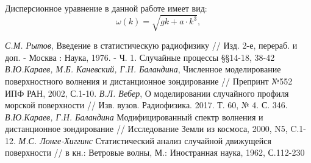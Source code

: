 Дисперсионное уравнение в данной работе имеет вид:
\begin{equation}
	\label{eq:w_k}
	\omega(k)=\sqrt{gk+a\cdot k^3},
\end{equation}

\newpage
\begin{thebibliography}{}
	 \textit{С.М. Рытов}, Введение в статистическую радиофизику // Изд. 2-е, перераб. и доп. - Москва : Наука, 1976. - Ч. 1. Случайные процессы \S\S 14-18, 38-42 
	 \textit{В.Ю.Караев, М.Б. Каневский, Г.Н. Баландина}, Численное моделирование поверхностного волнения и дистанционное зондирование // Препринт №552 ИПФ РАН, 2002, С.1-10.
	 \textit{В.Л. Вебер}, О моделировании случайного профиля морской поверхности // Изв. вузов. Радиофизика. 2017. Т. 60, № 4. С. 346.
	 \textit{В.Ю.Караев, Г.Н. Баландина} Модифицированный спектр волнения и дистанционное зондирование // Исследование Земли из космоса, 2000, N5, C.1-12.
	 \textit{М.С. Лонге-Хиггинс} Статистический анализ случайной движущейся поверхности // в кн.: Ветровые волны, М.: Иностранная наука, 1962, С.112-230
\end{thebibliography}
\newpage

